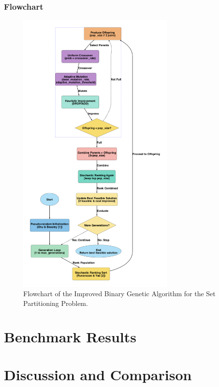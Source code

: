 \documentclass[12pt]{article}
\begin{document}
\subsubsection{Flowchart}
\begin{figure}[htbp]
  \centering
  \includegraphics[width=0.70\textwidth]{improved_bga_flowchart.png}
  \caption{Flowchart of the Improved Binary Genetic Algorithm for the Set Partitioning Problem.}
  \label{fig:flowchart3}
\end{figure}

\newpage

\section{Benchmark Results}
\label{sec:results}


\section{Discussion and Comparison}
\label{sec:discussion}
\end{document}
